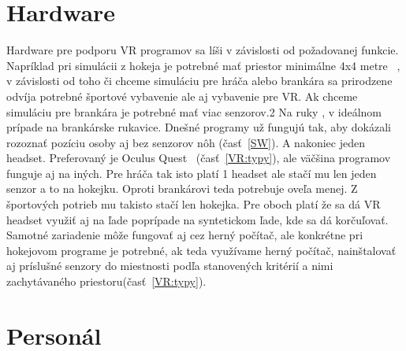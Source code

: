 \documentclass[10pt,twoside,slovak,a4paper]{article}										%
\begin{document}
\section{Hardware} \label{HW}
Hardware pre podporu VR programov sa líši v závislosti od požadovanej funkcie. Napríklad pri simulácii z hokeja je potrebné mať priestor minimálne 4x4 metre ~\cite{setuphk:zdroj}, v závislosti od toho či chceme simuláciu pre hráča alebo brankára sa prirodzene odvíja potrebné športové vybavenie ale aj vybavenie pre VR. Ak chceme simuláciu pre brankára je potrebné mať viac senzorov.2 Na ruky , v ideálnom prípade na brankárske rukavice. Dnešné programy už fungujú tak, aby dokázali rozoznať pozíciu osoby aj bez senzorov nôh (časť~\ref{SW}). A nakoniec jeden headset. Preferovaný je Oculus Quest ~\cite{headset:zdroj}(časť~\ref{VR:typy}), ale väčšina programov funguje aj na iných. Pre hráča tak isto platí 1 headset ale stačí mu len jeden senzor a to na hokejku. Oproti brankárovi teda potrebuje oveľa menej. Z športových potrieb mu takisto stačí len hokejka. Pre oboch platí že sa dá VR headset využiť aj na ľade poprípade na syntetickom ľade, kde sa dá korčuľovať. Samotné zariadenie môže fungovať aj cez herný počítač, ale konkrétne pri hokejovom programe je potrebné, ak teda využívame herný počítač, nainštalovať aj príslušné senzory do miestnosti podľa stanovených kritérií a nimi zachytávaného priestoru(časť~\ref{VR:typy}).

%

\section{Personál} \label{PR}
\end{document}
